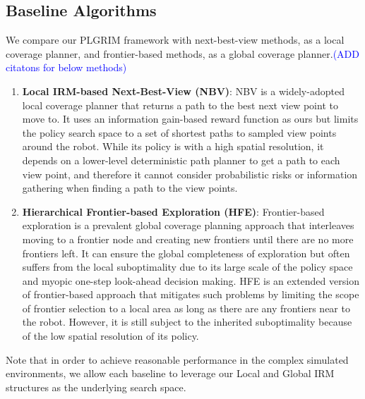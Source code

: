 \documentclass[letterpaper]{article} %
\begin{document}
\subsection{Baseline Algorithms}
We compare our PLGRIM framework with next-best-view methods, as a local coverage planner, and frontier-based methods, as a global coverage planner.\textcolor{blue}{(ADD citatons for below methods)}
\vspace{-3pt}
\begin{enumerate}[label={\arabic*)}]
  \itemsep0em 
  \setlength{\itemsep}{0pt}
  \setlength{\parskip}{0pt}
  \item \textbf{Local IRM-based Next-Best-View (NBV)}:
  NBV is a widely-adopted local coverage planner that returns a path to the best next view point to move to.
	It uses an information gain-based reward function as ours but limits the policy search space to a set of shortest paths to sampled view points around the robot.
  While its policy is with a high spatial resolution, it depends on a lower-level deterministic path planner to get a path to each view point, and therefore it cannot consider probabilistic risks or information gathering when finding a path to the view points.
  \item \textbf{Hierarchical Frontier-based Exploration (HFE)}:
	Frontier-based exploration is a prevalent global coverage planning approach that interleaves moving to a frontier node and creating new frontiers until there are no more frontiers left.
	It can ensure the global completeness of exploration but often suffers from the local suboptimality due to its large scale of the policy space and myopic one-step look-ahead decision making.
	HFE is an extended version of frontier-based approach that mitigates such problems by limiting the scope of frontier selection to a local area as long as there are any frontiers near to the robot.
	However, it is still subject to the inherited suboptimality because of the low spatial resolution of its policy.
\end{enumerate}
\vspace{-3pt}
Note that in order to achieve reasonable performance in the complex simulated environments, we allow each baseline to leverage our Local and Global IRM structures as the underlying search space.
\end{document}
